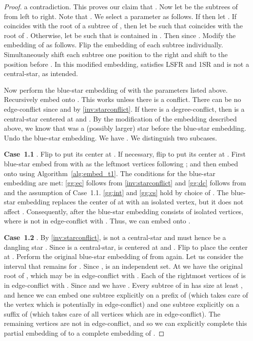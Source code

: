 \documentclass[11pt,a4paper,colorlinks=true,urlcolor=blue,citecolor=red]{article}
\theoremstyle{plain}
\newcommand{\case}[1]{\par\vspace{.5\baselineskip}\noindent\textbf{\sffamily Case~#1}}
\begin{document}
\begin{proof}
a contradiction. This proves our claim that . Now let
   be the subtrees of  from left to right. Note that
  . We select a parameter  as follows.
  If  then let . If  coincides with the root of a subtree
  of , then let  be such that  coincides with the root of
  . Otherwise, let  be such that  is contained in
  . Then  since . Modify the embedding of
   as follows. Flip the embedding of each subtree
   individually. Simultaneously shift each subtree
   one position to the right and shift  to the
  position before . In this modified embedding, 
  satisfies LSFR and 1SR and  is not a
  central-star, as intended.

  Now perform the blue-star embedding of  with the parameters listed
  above. Recursively embed  onto . This works unless
  there is a conflict. There can be no edge-conflict since
   and by \ref{inv:starconflict}. If there is
  a degree-conflict, then  is a central-star
  centered at  and . By
  the modification of the embedding described above, we know that
   was a (possibly larger) star before the blue-star
  embedding. Undo the blue-star embedding. We have
  . We distinguish two subcases.

  \case{1.1} . Flip  to put
  its center at . If necessary, flip  to put its
  center at . First blue-star embed  from  with 
  as the  leftmost vertices following ; and
  then embed  onto  using Algorithm~\ref{alg:embed_t1}.
  The conditions for the blue-star embedding are met: \ref{gg:ec}
  follows from \ref{inv:starconflict} and \ref{gg:dc} follows from
   and the assumption of
  Case~1.1. \ref{gg:int} and \ref{gg:cs} hold by choice of . The
  blue-star embedding replaces the center of  at 
  with an isolated vertex, but it does not affect . Consequently,
  after the blue-star embedding  consists of 
  isolated vertices, where  is not in edge-conflict with . Thus,
  we can embed  onto .

  \case{1.2} . By
  \ref{inv:starconflict},  is not a central-star and must
  hence be a dangling star . Since  is a
  central-star,  is centered at  and . Flip
   to place the center at . Perform the original
  blue-star embedding of  from  again. Let us consider the
  interval  that remains for . Since ,
   is an independent set. At  we have the original root
  of , which may be in edge-conflict with . Each of the
   rightmost vertices of  is in edge-conflict
  with . Since  and
   we have
  . Every subtree of  in
   has size at least , and hence we can embed one subtree
  explicitly on a prefix of  (which takes care of the vertex
   which is potentially in edge-conflict) and one subtree explicitly on
  a suffix of  (which takes care of all  vertices
  which are in edge-conflict). The remaining vertices are not in
  edge-conflict, and so we can explicitly complete this partial
  embedding of  to a complete embedding of .


\end{proof}
\end{document}
